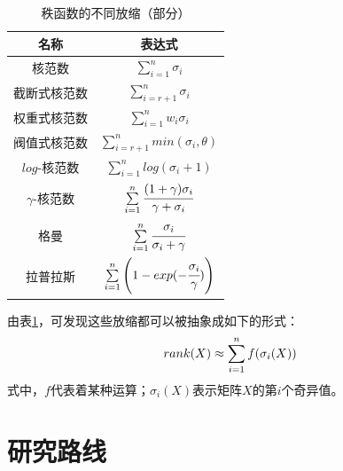 \documentclass[12pt, a4paper]{article}
\begin{document}
\begin{table}[H]
\centering
\caption{秩函数的不同放缩（部分）}
\label{relaxation}
		
\begin{tabular}{c c}
\toprule
名称&表达式\\
\toprule
核范数&$\sum\limits_{i=1}^{n}\sigma_i$\\
\hline
截断式核范数&$\sum\limits_{i=r+1}^{n}\sigma_i$\\
\hline
权重式核范数&$\sum\limits_{i=1}^{n}w_i\sigma_i$\\
\hline
阀值式核范数&$\sum\limits_{i=r+1}^{n}min(\sigma_i, \theta)$\\
\hline
$log$-核范数&$\sum\limits_{i=1}^{n}log(\sigma_i+1)$\\
\hline
$\gamma$-核范数&$\sum\limits_{i=1}^{n}\cfrac{(1+\gamma)\sigma_i}{\gamma+\sigma_i}$\\
\hline
格曼&$\sum\limits_{i=1}^{n}\cfrac{\sigma_i}{\sigma_i + \gamma}$\\
\hline
拉普拉斯&$\sum\limits_{i=1}^{n}\left(1-exp(-\cfrac{\sigma_i}{\gamma})\right)$\\
\bottomrule
\end{tabular}
\end{table}
\par 由表\ref{relaxation}，可发现这些放缩都可以被抽象成如下的形式：
\begin{displaymath}
\centering
rank(X) \approx \sum\limits_{i=1}^{n}f(\sigma_i(X))
\end{displaymath}
式中，$f$代表着某种运算；$\sigma_i(X)$表示矩阵$X$的第$i$个奇异值。
\newpage
\section{研究路线}\label{related-work}
\end{document}
